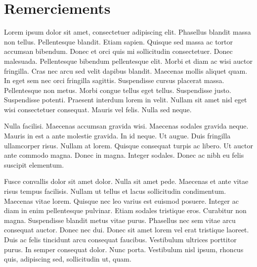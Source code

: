 \documentclass[logos,chaptertoc]{bordeaux-thesis}
\newcommand{\dummytext}{
Lorem ipsum dolor sit amet, consectetuer adipiscing elit. Phasellus blandit massa non tellus. Pellentesque blandit. Etiam sapien. Quisque sed massa ac tortor accumsan bibendum. Donec et orci quis mi sollicitudin consectetuer. Donec malesuada. Pellentesque bibendum pellentesque elit. Morbi et diam ac wisi auctor fringilla. Cras nec arcu sed velit dapibus blandit. Maecenas mollis aliquet quam. In eget sem nec orci fringilla sagittis. Suspendisse cursus placerat massa. Pellentesque non metus. Morbi congue tellus eget tellus. Suspendisse justo. Suspendisse potenti. Praesent interdum lorem in velit. Nullam sit amet nisl eget wisi consectetuer consequat. Mauris vel felis. Nulla sed neque.

Nulla facilisi. Maecenas accumsan gravida wisi. Maecenas sodales gravida neque. Mauris in est a ante molestie gravida. In id neque. Ut augue. Duis fringilla ullamcorper risus. Nullam at lorem. Quisque consequat turpis ac libero. Ut auctor ante commodo magna. Donec in magna. Integer sodales. Donec ac nibh eu felis suscipit elementum.

Fusce convallis dolor sit amet dolor. Nulla sit amet pede. Maecenas et ante vitae risus tempus facilisis. Nullam ut tellus et lacus sollicitudin condimentum. Maecenas vitae lorem. Quisque nec leo varius est euismod posuere. Integer ac diam in enim pellentesque pulvinar. Etiam sodales tristique eros. Curabitur non magna. Suspendisse blandit metus vitae purus. Phasellus nec sem vitae arcu consequat auctor. Donec nec dui. Donec sit amet lorem vel erat tristique laoreet. Duis ac felis tincidunt arcu consequat faucibus. Vestibulum ultrices porttitor purus. In semper consequat dolor. Nunc porta. Vestibulum nisl ipsum, rhoncus quis, adipiscing sed, sollicitudin ut, quam.
}
\begin{document}
\begin{abstract}[english]
In addition to the Solar System and its planets, we now have a database of nearly 1000 planets that emphasize the huge diversity of planets and systems that can be formed. This diversity is a challenge for planetary formation models. Type I migration is one of the mechanisms possible to explain this diversity. Depending on disc properties, planets can migrate inward or outward with respect to their host star. The huge parameter space of protoplanetary disc models can form a huge diversity of planetary systems, in agreement with the diversity observed in the nonetheless small sample accessible to us. Thanks to numerical simulations, I showed that within the same disc, it is possible to form super-Earths or giant planet cores, depending on the migration history of an initial population of embryos.
\end{abstract}


\pagebreak\strut\newpage

\chapter*{Remerciements}
\vfill
\dummytext



\newpage


\strut\newpage

\tableofcontents
\mtcaddchapter %

\listoffigures
\mtcaddchapter %

\listoftables
\mtcaddchapter %
\end{document}
